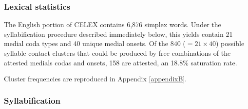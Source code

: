 





\subsubsection{Lexical statistics}

The English portion of CELEX contains 6,876 simplex words. Under the syllabification procedure described immediately below, this yields contain 21 medial coda types and 40 unique medial onsets. Of the 840 ($= 21 \times 40$) possible syllable contact clusters that could be produced by free combinations of the attested medials codas and onsets, 158 are attested, an 18.8\% saturation rate.

Cluster frequencies are reproduced in Appendix \ref{appendixB}.

\subsubsection{Syllabification}

